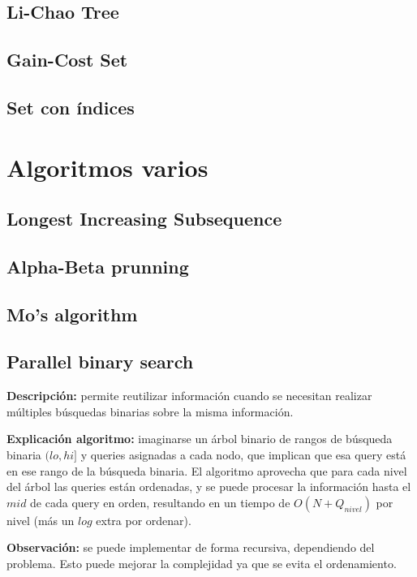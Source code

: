 \subsection{Li-Chao Tree}
\subsection{Gain-Cost Set}
\subsection{Set con índices}


\section{Algoritmos varios}%
\subsection{Longest Increasing Subsequence}
\subsection{Alpha-Beta prunning}
\subsection{Mo's algorithm}
\subsection{Parallel binary search}
\textbf{Descripción:} permite reutilizar información cuando se necesitan
realizar múltiples búsquedas binarias sobre la misma información.

\textbf{Explicación algoritmo:} imaginarse un árbol binario de rangos de
búsqueda binaria $(lo, hi]$ y queries asignadas a cada nodo, que implican que
esa query está en ese rango de la búsqueda binaria. El algoritmo aprovecha
que para cada nivel del árbol las queries están ordenadas, y se puede procesar
la información hasta el $mid$ de cada query en orden, resultando en un tiempo de
$O(N + Q_{nivel})$ por nivel (más un $log$ extra por ordenar). 

\textbf{Observación: } se puede implementar de forma recursiva, dependiendo del
problema. Esto puede mejorar la complejidad ya que se evita el ordenamiento.

